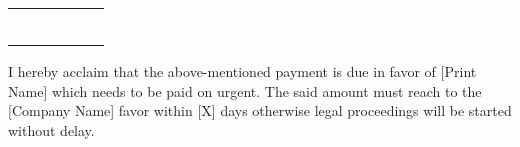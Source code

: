\documentclass[14pt]{article}
\begin{document}
\begin{table}[H]
\begin{adjustbox}{max width=\textwidth}
\begin{tabular}{p{2.04cm}p{2.71cm}p{4.76cm}p{3.20cm}p{3.19cm}p{3.15cm}}
\hhline{------}
\multicolumn{1}{|p{2.04cm}|}{\par \centering {\footnotesize{ }}} & 
\multicolumn{1}{|p{2.71cm}|}{\par \centering {\footnotesize{ }}} & 
\multicolumn{1}{|p{4.76cm}|}{\par \centering {\footnotesize{ }}} & 
\multicolumn{1}{|p{3.20cm}|}{\par \centering {\footnotesize{ }}} & 
\multicolumn{1}{|p{3.19cm}|}{\par \centering {\footnotesize{ }}} & 
\multicolumn{1}{|p{3.15cm}|}{\par \centering {\footnotesize{ }}} \\ 
\hhline{------}
\multicolumn{3}{|p{9.51cm}|}{\multirow{4}{*}{\parbox{9.51cm}{\par \raggedright { }}}} & 
\multicolumn{1}{|p{3.20cm}|}{\centering {Total Discount}} & 
\multicolumn{1}{|p{3.19cm}|}{\centering {5}} & 
\multicolumn{1}{|p{3.15cm}|}{\par \centering {\footnotesize{545}}} \\ 
\hhline{-~~---}
\multicolumn{1}{|p{2.04cm}|}{ } & 
\multicolumn{1}{p{2.71cm}}{ } & 
\multicolumn{1}{p{4.76cm}}{ } & 
\multicolumn{1}{|p{3.20cm}|}{\multirow{3}{*}{\parbox{3.20cm}{\par \centering { }}}} & 
\multicolumn{1}{|p{3.19cm}|}{\centering {Subtotal
}} & 
\multicolumn{1}{|p{3.15cm}|}{\centering {\footnotesize{ }}} \\ 
\hhline{-~~---}
\multicolumn{1}{|p{2.04cm}|}{ } & 
\multicolumn{1}{p{2.71cm}}{ } & 
\multicolumn{1}{p{4.76cm}}{ } & 
\multicolumn{1}{|p{3.20cm}|}{ } & 
\multicolumn{1}{|p{3.19cm}|}{\centering {Sales Tax
}} & 
\multicolumn{1}{|p{3.15cm}|}{\centering {\footnotesize{ }}} \\ 
\hhline{-~~---}
\multicolumn{1}{|p{2.04cm}|}{ } & 
\multicolumn{1}{p{2.71cm}}{ } & 
\multicolumn{1}{p{4.76cm}}{ } & 
\multicolumn{1}{|p{3.20cm}|}{ } & 
\multicolumn{1}{|p{3.19cm}|}{\centering {Total Amount}} & 
\multicolumn{1}{|p{3.15cm}|}{\centering {\footnotesize{ }}} \\ 
\hhline{-~~---}
\end{tabular}
\end{adjustbox}
\end{table}
\raggedright \par \raggedright {I hereby acclaim that the above-mentioned payment is due in favor of [Print Name] which needs to be paid on urgent. The said amount must reach to the [Company Name] favor within [X] days otherwise legal proceedings will be started without delay.\par }
\end{document}
